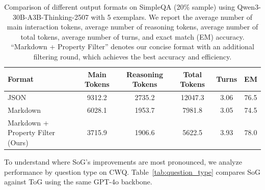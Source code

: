 \documentclass[sigconf]{acmart}
\begin{document}
\begin{table}[t]
\centering
\caption{Performance breakdown by question type on CWQ.}
\label{tab:question_type}
\end{table}

\begin{table}[t]
\centering
\caption{Comparison of different output formats on SimpleQA (20\% sample) using Qwen3-30B-A3B-Thinking-2507 with 5 exemplars. We report the average number of main interaction tokens, average number of reasoning tokens, average number of total tokens, average number of turns, and exact match (EM) accuracy. ``Markdown + Property Filter'' denotes our concise format with an additional filtering round, which achieves the best accuracy and efficiency.}
\begin{tabular}{lccccc}
\toprule
\textbf{Format} & \textbf{Main Tokens} & \textbf{Reasoning Tokens} & \textbf{Total Tokens} & \textbf{Turns} & \textbf{EM} \\
\midrule
JSON            & 9312.2             & 2735.2               & 12047.3             & 3.06             & 76.5       \\
Markdown        & 6028.1             & 1953.7               & 7981.8              & 3.05             & 74.5       \\
Markdown + Property Filter (Ours)  & 3715.9             & 1906.6               & 5622.5              & 3.93             & 78.0       \\
\bottomrule
\end{tabular}
\label{tab:output-format-comparison}
\end{table}

To understand where SoG's improvements are most pronounced, we analyze performance by question type on CWQ. Table~\ref{tab:question_type} compares SoG against ToG using the same GPT-4o backbone.
\end{document}
